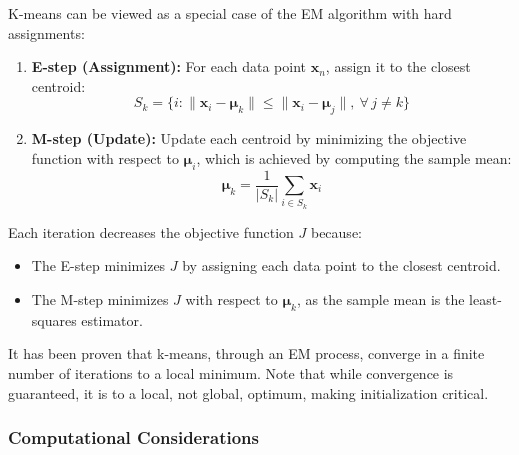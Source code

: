 \documentclass[12pt]{article}
\begin{document}
K-means can be viewed as a special case of the EM algorithm with hard assignments:
\begin{enumerate}
    \item \textbf{E-step (Assignment):} For each data point $\bm{x}_n$, assign it to the closest centroid:
    \begin{equation}
    S_k = \{ i : \lVert \bm{x}_i - \bm{\mu}_k \rVert \leq \lVert \bm{x}_i - \bm{\mu}_j \rVert,\ \forall\, j \neq k \}
    \end{equation}
    \item \textbf{M-step (Update):} Update each centroid by minimizing the objective function with respect to $\bm{\mu}_i$, which is achieved by computing the sample mean:
    \begin{equation}
    \bm{\mu}_k = \frac{1}{|S_k|} \sum_{i \in S_k} \bm{x}_i
    \end{equation}
\end{enumerate}
Each iteration decreases the objective function $J$ because:
\begin{itemize}
    \item The E-step minimizes $J$ by assigning each data point to the closest centroid.
    \item The M-step minimizes $J$ with respect to $\bm{\mu}_k$, as the sample mean is the least-squares estimator.
\end{itemize}
It has been proven that k-means, through an EM process, converge in a finite number of iterations to a local minimum. Note that while convergence is guaranteed, it is to a local, not global, optimum, making initialization critical.

\subsubsection{Computational Considerations}
\end{document}
